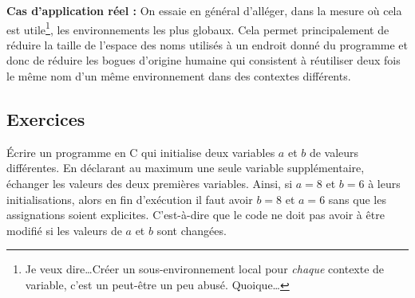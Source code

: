 \documentclass[../../../main.tex]{subfiles}
\begin{document}
\textbf{Cas d'application réel :} On essaie en général d'alléger, dans la mesure où cela est utile\footnote{Je veux dire\dots Créer un sous-environnement local pour \textit{chaque} contexte de variable, c'est un peut-être un peu abusé. Quoique\dots}, les environnements les plus globaux. Cela permet principalement de réduire la taille de l'espace des noms utilisés à un endroit donné du programme et donc de réduire les bogues d'origine humaine qui consistent à réutiliser deux fois le même nom d'un même environnement dans des contextes différents.
\subsection{Exercices}
 Écrire un programme en C qui initialise deux variables $a$ et $b$ de valeurs différentes. En déclarant au maximum une seule variable supplémentaire, échanger les valeurs des deux premières variables. Ainsi, si $a = 8$ et $b = 6$ à leurs initialisations, alors en fin d'exécution il faut avoir $b = 8$ et $a = 6$ sans que les assignations soient explicites. C'est-à-dire que le code ne doit pas avoir à être modifié si les valeurs de $a$ et $b$ sont changées.
\end{document}
